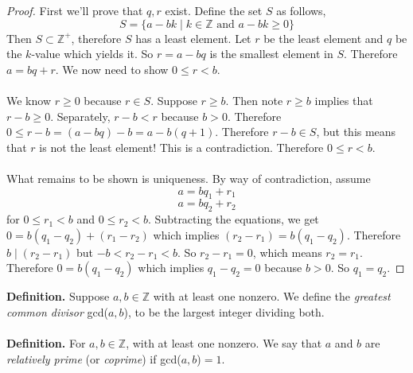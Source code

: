 \documentclass[class=article, crop=false]{standalone}
\def\integers{{\mathbb Z}}
\begin{document}
\begin{proof}
	First we'll prove that $q,r$ exist. Define the set $S$ as follows, $$S = \{a-bk \mid k\in\integers \text{ and } a-bk\geq 0\}$$
	Then $S\subset \integers^{+}$, therefore $S$ has a least element. Let $r$ be the least element and $q$ be the $k$-value
	which yields it. So $r=a-bq$ is the smallest element in $S$. Therefore $a=bq+r$. We now need to show $0\leq r<b$.\\\\
	We know $r\geq 0$ because $r\in S$. Suppose $r\geq b$. Then note $r\geq b$ implies that $r-b\geq 0$. Separately, $r-b<r$
	because $b>0$. Therefore $0\leq r-b=(a-bq)-b=a-b(q+1)$. Therefore $r-b\in S$, but this means that $r$ is not the least element!
	This is a contradiction. Therefore $0\leq r<b$.\\\\
	What remains to be shown is uniqueness. By way of contradiction, assume $$a=bq_1 + r_1$$ $$a=bq_2 + r_2$$ for
	$0\leq r_1<b$ and $0\leq r_2<b$. Subtracting the equations, we get $0=b(q_1-q_2)+(r_1-r_2)$ which implies
	$(r_2-r_1) = b(q_1-q_2)$. Therefore $b\mid (r_2-r_1)$ but $-b<r_2-r_1<b$. So $r_2-r_1=0$, which means $r_2=r_1$.
	Therefore $0=b(q_1 -q_2)$ which implies $q_1-q_2=0$ because $b>0$. So $q_1=q_2$.
\end{proof}
\noindent\textbf{Definition.} Suppose $a,b\in\integers$ with at least one nonzero. We define the \emph{greatest common divisor}
gcd($a,b$), to be the largest integer dividing both.\\\\
\noindent\textbf{Definition.} For $a,b\in\integers$, with at least one nonzero. We say that $a$ and $b$ are \emph{relatively prime}
(or \emph{coprime}) if gcd($a,b$)$=1$.
\end{document}
